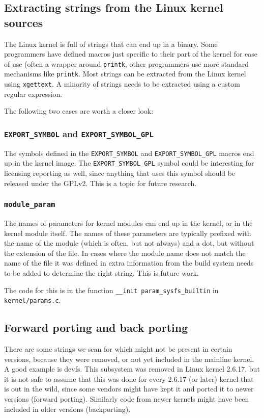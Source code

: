 \documentclass[10pt]{article}
\begin{document}
\subsection{Extracting strings from the Linux kernel sources}

The Linux kernel is full of strings that can end up in a binary. Some
programmers have defined macros just specific to their part of the kernel for
ease of use (often a wrapper around \texttt{printk}, other programmers use
more standard mechanisms like \texttt{printk}. Most strings can be extracted
from the Linux kernel using \texttt{xgettext}. A minority of strings needs to
be extracted using a custom regular expression.

The following two cases are worth a closer look:

\subsubsection{\texttt{EXPORT\_SYMBOL} and \texttt{EXPORT\_SYMBOL\_GPL}}

The symbols defined in the \texttt{EXPORT\_SYMBOL} and
\texttt{EXPORT\_SYMBOL\_GPL} macros end up in the kernel image. The
\texttt{EXPORT\_SYMBOL\_GPL} symbol could be interesting for licensing
reporting as well, since anything that uses this symbol should be released
under the GPLv2. This is a topic for future research.

\subsubsection{\texttt{module\_param}}

The names of parameters for kernel modules can end up in the kernel, or in the
kernel module itself. The names of these parameters are typically prefixed
with the name of the module (which is often, but not always) and a dot, but
without the extension of the file. In cases where the module name does not
match the name of the file it was defined in extra information from the
build system needs to be added to determine the right string. This is future
work.

The code for this is in the function \texttt{\_\_init param\_sysfs\_builtin} in
\texttt{kernel/params.c}.

\subsection{Forward porting and back porting}

There are some strings we scan for which might not be present in certain
versions, because they were removed, or not yet included in the mainline
kernel. A good example is devfs. This subsystem was removed in Linux kernel
2.6.17, but it is not safe to assume that this was done for every 2.6.17 (or
later) kernel that is out in the wild, since some vendors might have kept it
and ported it to newer versions (forward porting). Similarly code from newer
kernels might have been included in older versions
(backporting).
\end{document}
